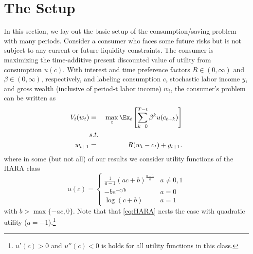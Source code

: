 \documentclass[titlepage]{\econtex}
\begin{document}
\section{The Setup}\label{sec:Setup}
%
  
  In this section, we lay out the basic setup of the consumption/saving problem with many periods. Consider a consumer who faces some future risks but is not subject to any current or future liquidity constraints.  The consumer is maximizing the time-additive present discounted value of utility from consumption $u(c)$.  With interest and time preference factors $R \in (0,\infty)$ and $\beta \in (0,\infty)$, respectively, and labeling consumption $c$, stochastic labor income $y$, and gross wealth (inclusive of period-t labor income) $w_{t}$, the consumer's problem can be written as%
\begin{eqnarray*}
V_{t}(w_{t}) &=&
                 \max_{c} \Ex_{t}\left[\sum_{k=0}^{T-t}\beta^{k} u({c_{t+k}})\right]   \label{eq:valuefn} \\
   & s.t. &  \nonumber
\\              w_{t+1} & = & R(w_{t}-c_{t})+y_{t+1}.
\nonumber
\end{eqnarray*}
where in some (but not all) of our results we consider utility functions of the HARA class
\begin{equation}\label{eq:HARA}
  u(c) = \begin{cases} \frac{1}{a - 1}\left(ac + b\right)^{\frac{a-1}{a}} & a \neq 0,1 \\
-be^{-c/b} & a = 0 \\
\log(c + b) & a = 1 \end{cases} \end{equation}
with $b > \max\{- ac,0\}$. Note that that \eqref{eq:HARA} nests the case with quadratic utility ($a = -1$).\footnote{$u'(c)>0$ and $u''(c) < 0$ is holds for all utility functions in this class.}
\end{document}
